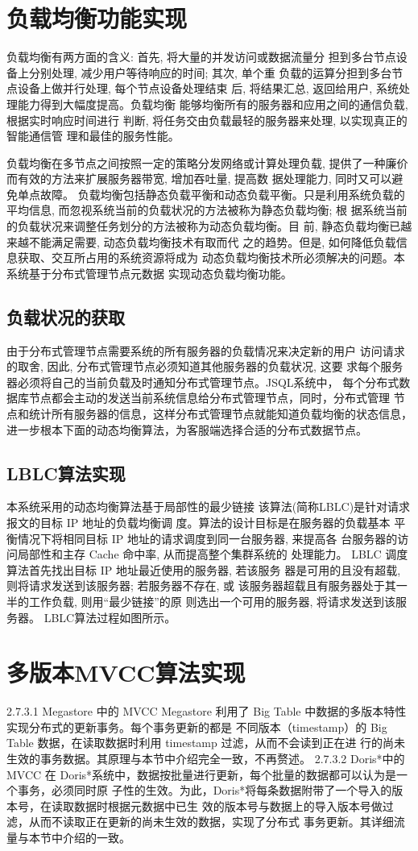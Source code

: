 \section{负载均衡功能实现}
负载均衡有两方面的含义: 首先, 将大量的并发访问或数据流量分
担到多台节点设备上分别处理, 减少用户等待响应的时间; 其次, 单个重
负载的运算分担到多台节点设备上做并行处理, 每个节点设备处理结束
后, 将结果汇总, 返回给用户, 系统处理能力得到大幅度提高。负载均衡
能够均衡所有的服务器和应用之间的通信负载, 根据实时响应时间进行
判断, 将任务交由负载最轻的服务器来处理, 以实现真正的智能通信管
理和最佳的服务性能。

负载均衡在多节点之间按照一定的策略分发网络或计算处理负载,
提供了一种廉价而有效的方法来扩展服务器带宽, 增加吞吐量, 提高数
据处理能力, 同时又可以避免单点故障。
负载均衡包括静态负载平衡和动态负载平衡。只是利用系统负载的
平均信息, 而忽视系统当前的负载状况的方法被称为静态负载均衡; 根
据系统当前的负载状况来调整任务划分的方法被称为动态负载均衡。目
前, 静态负载均衡已越来越不能满足需要, 动态负载均衡技术有取而代
之的趋势。但是, 如何降低负载信息获取、交互所占用的系统资源将成为
动态负载均衡技术所必须解决的问题。本系统基于分布式管理节点元数据
实现动态负载均衡功能。
\subsection{负载状况的获取}
由于分布式管理节点需要系统的所有服务器的负载情况来决定新的用户
访问请求的取舍, 因此, 分布式管理节点必须知道其他服务器的负载状况, 这要
求每个服务器必须将自己的当前负载及时通知分布式管理节点。JSQL系统中，
每个分布式数据库节点都会主动的发送当前系统信息给分布式管理节点，同时，分布式管理
节点和统计所有服务器的信息，这样分布式管理节点就能知道负载均衡的状态信息，
进一步根本下面的动态均衡算法，为客服端选择合适的分布式数据节点。
\subsection{LBLC算法实现}
本系统采用的动态均衡算法基于局部性的最少链接
该算法(简称LBLC)是针对请求报文的目标 IP 地址的负载均衡调
度。算法的设计目标是在服务器的负载基本
平衡情况下将相同目标 IP 地址的请求调度到同一台服务器, 来提高各
台服务器的访问局部性和主存 Cache 命中率, 从而提高整个集群系统的
处理能力。
LBLC 调度算法首先找出目标 IP 地址最近使用的服务器, 若该服务
器是可用的且没有超载, 则将请求发送到该服务器; 若服务器不存在, 或
该服务器超载且有服务器处于其一半的工作负载, 则用“最少链接”的原
则选出一个可用的服务器, 将请求发送到该服务器。
LBLC算法过程如图所示。
\section{多版本MVCC算法实现}
2.7.3.1 Megastore 中的 MVCC
Megastore 利用了 Big Table 中数据的多版本特性实现分布式的更新事务。每个事务更新的都是
不同版本（timestamp）的 Big Table 数据，在读取数据时利用 timestamp 过滤，从而不会读到正在进
行的尚未生效的事务数据。其原理与本节中介绍完全一致，不再赘述。
2.7.3.2 Doris*中的 MVCC
在 Doris*系统中，数据按批量进行更新，每个批量的数据都可以认为是一个事务，必须同时原
子性的生效。为此，Doris*将每条数据附带了一个导入的版本号，在读取数据时根据元数据中已生
效的版本号与数据上的导入版本号做过滤，从而不读取正在更新的尚未生效的数据，实现了分布式
事务更新。其详细流量与本节中介绍的一致。
